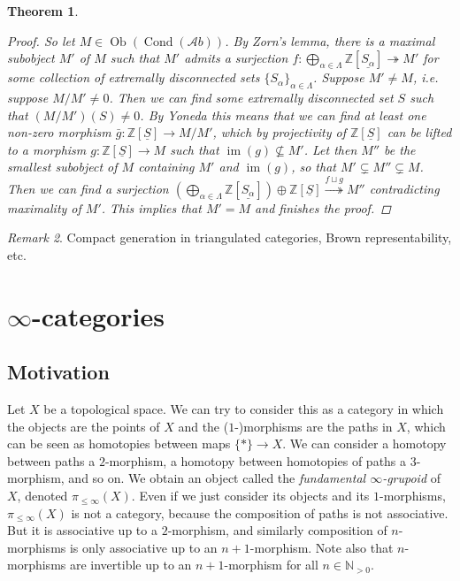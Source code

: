 \documentclass[11pt,A4]{article}
\theoremstyle{plain}
\newtheorem{thm}{Theorem}[section]
\theoremstyle{definition}
\theoremstyle{remark}
\newtheorem{rem}[thm]{Remark}
\newcommand{\N}{\mathbb{N}}
\newcommand{\Z}{\mathbb{Z}}
\newcommand{\Ab}{\mathscr{A}b}
\DeclareMathOperator{\Cond}{Cond}
\DeclareMathOperator{\Ob}{Ob}
\DeclareMathOperator{\im}{im}
\renewcommand{\u}[1]{\underline{#1}}
\newcommand{\op}{\oplus}
\begin{document}
\begin{thm}
\begin{proof}
	So let $M\in \Ob(\Cond(\Ab))$.
	By Zorn's lemma, there is a maximal subobject $M'$ of $M$ such that $M'$ admits a surjection $f\colon \bigoplus_{\alpha\in \Lambda}\Z[\u{S_{\alpha}}]\twoheadrightarrow M'$ for some collection of extremally disconnected sets $\{S_{\alpha}\}_{\alpha\in \Lambda}$.
	Suppose $M'\neq M$, i.e. suppose $M/M'\neq 0$.
	Then we can find some extremally disconnected set $S$ such that $(M/M')(S)\neq 0$.
	By Yoneda this means that we can find at least one non-zero morphism $\bar{g}\colon \Z[\u{S}]\to M/M'$, which by projectivity of $\Z[\u{S}]$ can be lifted to a morphism $g\colon \Z[\u{S}]\to M$ such that $\im(g)\not\subseteq M'$.
	Let then $M''$ be the smallest subobject of $M$ containing $M'$ and $\im(g)$, so that $M'\subsetneq M''\subsetneq M$.
	Then we can find a surjection $(\bigoplus_{\alpha\in \Lambda} \Z[\u{S_{\alpha}}])\op \Z[\u{S}]\overset{f\sqcup g}{\twoheadrightarrow} M''$ contradicting maximality of $M'$.
	This implies that $M'=M$ and finishes the proof.
    \end{proof}
\end{thm}

\begin{rem}
    Compact generation in triangulated categories, Brown representability, etc.
\end{rem}

\section{$\infty$-categories}

\subsection{Motivation}

Let $X$ be a topological space.
We can try to consider this as a category in which the objects are the points of $X$ and the ($1$-)morphisms are the paths in $X$, which can be seen as homotopies between maps $\{ *\}\to X$.
We can consider a homotopy between paths a $2$-morphism, a homotopy between homotopies of paths a $3$-morphism, and so on.
We obtain an object called the \textit{fundamental $\infty$-grupoid} of $X$, denoted $\pi_{\leqslant \infty}(X)$.
Even if we just consider its objects and its $1$-morphisms, $\pi_{\leqslant \infty }(X)$ is not a category, because the composition of paths is not associative.
But it is associative up to a $2$-morphism, and similarly composition of $n$-morphisms is only associative up to an $n+1$-morphism.
Note also that $n$-morphisms are invertible up to an $n+1$-morphism for all $n\in \N_{>0}$.
\end{document}

